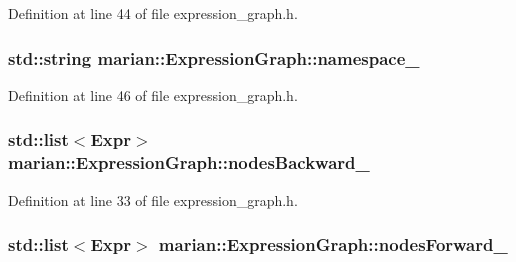 Definition at line 44 of file expression\+\_\+graph.\+h.

\subsubsection[{\texorpdfstring{namespace\+\_\+}{namespace_}}]{\setlength{\rightskip}{0pt plus 5cm}std\+::string marian\+::\+Expression\+Graph\+::namespace\+\_\+\hspace{0.3cm}{\ttfamily [private]}}\hypertarget{classmarian_1_1ExpressionGraph_a62c31bfad16a2939bced2f37b45dd8d7}{}\label{classmarian_1_1ExpressionGraph_a62c31bfad16a2939bced2f37b45dd8d7}


Definition at line 46 of file expression\+\_\+graph.\+h.

\subsubsection[{\texorpdfstring{nodes\+Backward\+\_\+}{nodesBackward_}}]{\setlength{\rightskip}{0pt plus 5cm}std\+::list$<${\bf Expr}$>$ marian\+::\+Expression\+Graph\+::nodes\+Backward\+\_\+\hspace{0.3cm}{\ttfamily [private]}}\hypertarget{classmarian_1_1ExpressionGraph_a8fa57dfedd51284cf51b1ba25401b646}{}\label{classmarian_1_1ExpressionGraph_a8fa57dfedd51284cf51b1ba25401b646}


Definition at line 33 of file expression\+\_\+graph.\+h.

\subsubsection[{\texorpdfstring{nodes\+Forward\+\_\+}{nodesForward_}}]{\setlength{\rightskip}{0pt plus 5cm}std\+::list$<${\bf Expr}$>$ marian\+::\+Expression\+Graph\+::nodes\+Forward\+\_\+\hspace{0.3cm}{\ttfamily [private]}}\hypertarget{classmarian_1_1ExpressionGraph_a10819abcacf6b7ea924a895f90059473}{}\label{classmarian_1_1ExpressionGraph_a10819abcacf6b7ea924a895f90059473}


